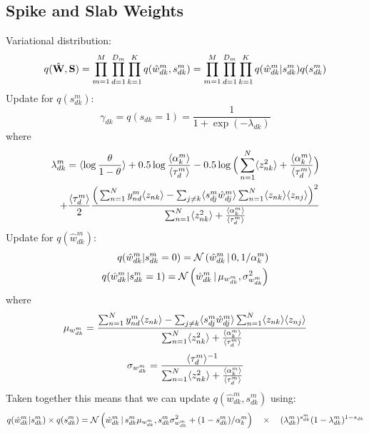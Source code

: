 \documentclass[10pt, a4paper,openany]{report}
\begin{document}
\subsection*{Spike and Slab Weights}
Variational distribution:
\[
q(\hat{{\bf W}},{\bf S}) = \prod_{m=1}^{M} \prod_{d=1}^{D_m} \prod_{k=1}^{K} q(\hat{w}_{dk}^m,s_{dk}^m) = \prod_{m=1}^{M} \prod_{d=1}^{D_m} \prod_{k=1}^{K} q(\hat{w}_{dk}^m|s_{dk}^m)q(s_{dk}^m)
\]
Update for $q(s_{dk}^m)$:
\[
\gamma_{dk} = q(s_{dk}=1) = \frac{1}{1+\exp(-\lambda_{dk})}
\]
where
\begin{align*}
\lambda_{dk}^m = \langle \log\frac{\theta}{1-\theta} \rangle + 0.5\log\frac{\langle\alpha_k^m\rangle}{\langle\tau_d^m\rangle} - 0.5\log\Big( \sum_{n=1}^{N} \langle z_{nk}^2 \rangle + \frac{\langle\alpha_k^m\rangle}{\langle\tau_d^m\rangle} \Big) \\
+ \frac{\langle\tau_d^m\rangle}{2} \frac{ \Big( \sum_{n=1}^{N} y_{nd}^m \langle z_{nk} \rangle - \sum_{j \neq k} \langle s_{dj}^m\hat{w}_{dj}^m\rangle \sum_{n=1}^{N} \langle z_{nk} \rangle \langle z_{nj} \rangle \Big)^2} {\sum_{n=1}^{N} \langle z_{nk}^2 \rangle + \frac{\langle\alpha_k^m\rangle}{\langle\tau_d^m\rangle} }
\end{align*}
Update for $q(\hat{w}_{dk}^m)$:
\begin{align*}
q(\hat{w}_{dk}^m|s_{dk}^m=0) = \mathcal{N}\left(\hat{w}_{dk}^m \,|\, 0,1/\alpha_k^m\right) \\
q(\hat{w}_{dk}^m|s_{dk}^m=1) = \mathcal{N}\left(\hat{w}_{dk}^m \,|\, \mu_{w_{dk}^m},\sigma_{w_{dk}^m}^2\right)
\end{align*}
where
\[
\mu_{w_{dk}^m} = \frac{ \sum_{n=1}^{N} y_{nd}^m \langle z_{nk} \rangle - \sum_{j \neq k} \langle s_{dj}^m\hat{w}_{dj}^m \rangle \sum_{n=1}^{N} \langle z_{nk} \rangle \langle z_{nj} \rangle } { \sum_{n=1}^{N} \langle z_{nk}^2 \rangle + \frac{\langle\alpha_k^m\rangle}{\langle\tau_d^m\rangle} }
\]
\[
\sigma_{w_{dk}^m} = \frac{ \langle\tau_d^m\rangle^{-1} } { \sum_{n=1}^{N} \langle z_{nk}^2 \rangle + \frac{\langle\alpha_k^m\rangle}{\langle\tau_d^m\rangle} }
\]
Taken together this means that we can update $q(\hat{w}_{dk}^m,s_{dk}^m)$ using:
\[
q(\hat{w}_{dk}^m|s_{dk}^m) \times q(s_{dk}^m) = \mathcal{N}\left( \hat{w}_{dk}^m  \,|\,  s_{dk}^m \mu_{w_{dk}^m}, s_{dk}^m\sigma_{w_{dk}^m}^2 + (1-s_{dk}^m)/\alpha_k^m\right) \quad \times \quad (\lambda_{dk}^m)^{s_{dk}^m} (1-\lambda_{dk}^m)^{1-s_{dk}}
\]
\end{document}
